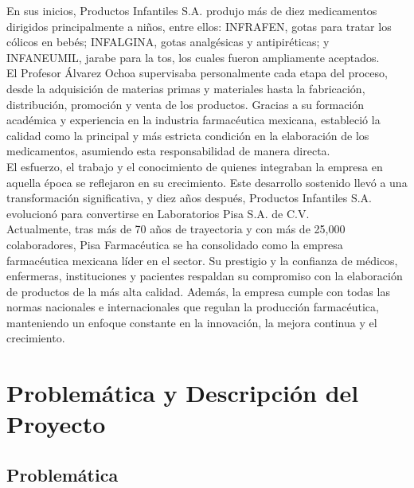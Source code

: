 \documentclass[12pt,letterpaper,spanish, xcolor=table]{report}
\numberwithin{figure}{subsection}
\begin{document}
En sus inicios, Productos Infantiles S.A. produjo más de diez medicamentos dirigidos principalmente a niños, entre ellos: INFRAFEN, gotas para tratar los cólicos en bebés; INFALGINA, gotas analgésicas y antipiréticas; y INFANEUMIL, jarabe para la tos, los cuales fueron ampliamente aceptados.\\

El Profesor Álvarez Ochoa supervisaba personalmente cada etapa del proceso, desde la adquisición de materias primas y materiales hasta la fabricación, distribución, promoción y venta de los productos. Gracias a su formación académica y experiencia en la industria farmacéutica mexicana, estableció la calidad como la principal y más estricta condición en la elaboración de los medicamentos, asumiendo esta responsabilidad de manera directa.\\

El esfuerzo, el trabajo y el conocimiento de quienes integraban la empresa en aquella época se reflejaron en su crecimiento. Este desarrollo sostenido llevó a una transformación significativa, y diez años después, Productos Infantiles S.A. evolucionó para convertirse en Laboratorios Pisa S.A. de C.V.\\

Actualmente, tras más de 70 años de trayectoria y con más de 25,000 colaboradores, Pisa Farmacéutica se ha consolidado como la empresa farmacéutica mexicana líder en el sector. Su prestigio y la confianza de médicos, enfermeras, instituciones y pacientes respaldan su compromiso con la elaboración de productos de la más alta calidad. Además, la empresa cumple con todas las normas nacionales e internacionales que regulan la producción farmacéutica, manteniendo un enfoque constante en la innovación, la mejora continua y el crecimiento.\\



\newpage
	
\chapter{Problemática y Descripción del Proyecto}
\newpage

\section{Problemática}
\end{document}

